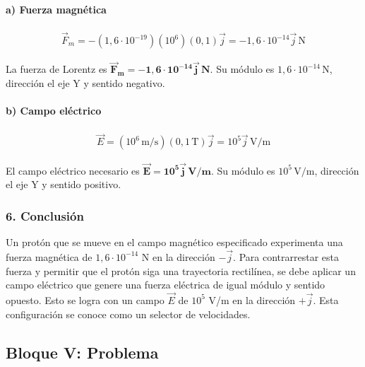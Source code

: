 \paragraph{a) Fuerza magnética}
\begin{gather}
    \vec{F}_m = -(1,6\cdot10^{-19})(10^6)(0,1)\vec{j} = -1,6\cdot10^{-14}\vec{j}\,\text{N}
\end{gather}
\begin{cajaresultado}
La fuerza de Lorentz es $\boldsymbol{\vec{F}_m = -1,6\cdot10^{-14}\vec{j}\,\textbf{N}}$. Su módulo es $1,6\cdot10^{-14}\,\text{N}$, dirección el eje Y y sentido negativo.
\end{cajaresultado}

\paragraph{b) Campo eléctrico}
\begin{gather}
    \vec{E} = (10^6\,\text{m/s})(0,1\,\text{T})\vec{j} = 10^5\vec{j}\,\text{V/m}
\end{gather}
\begin{cajaresultado}
El campo eléctrico necesario es $\boldsymbol{\vec{E} = 10^5\vec{j}\,\textbf{V/m}}$. Su módulo es $10^5\,\text{V/m}$, dirección el eje Y y sentido positivo.
\end{cajaresultado}

\subsubsection*{6. Conclusión}
\begin{cajaconclusion}
Un protón que se mueve en el campo magnético especificado experimenta una fuerza magnética de $1,6\cdot10^{-14}$ N en la dirección $-\vec{j}$. Para contrarrestar esta fuerza y permitir que el protón siga una trayectoria rectilínea, se debe aplicar un campo eléctrico que genere una fuerza eléctrica de igual módulo y sentido opuesto. Esto se logra con un campo $\vec{E}$ de $10^5$ V/m en la dirección $+\vec{j}$. Esta configuración se conoce como un selector de velocidades.
\end{cajaconclusion}

\newpage

\subsection{Bloque V: Problema}
\label{subsec:B5_2011_jun_ord}


